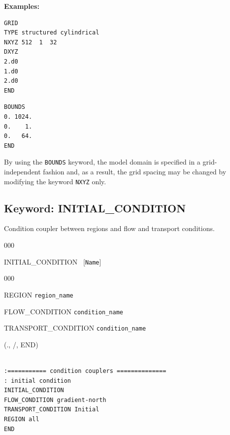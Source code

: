\documentclass[12pt]{article}
\begin{document}
\noindent
{\bf Examples:}
\begin{verbatim}
GRID
TYPE structured cylindrical
NXYZ 512  1  32
DXYZ
2.d0
1.d0
2.d0
END
\end{verbatim}

\begin{verbatim}
BOUNDS
0. 1024.
0.    1.
0.   64.
END
\end{verbatim}

\noindent
By using the {\tt BOUNDS} keyword, the model domain is specified in a grid-independent fashion and, as a result, the grid spacing may be changed by modifying the keyword {\tt NXYZ} only.


\newpage
\protect\hypertarget{target_init}{}

\subsection{Keyword: INITIAL\_CONDITION}

 Condition coupler between regions and flow and transport conditions.

\begin{deflist}{000}
\item[INITIAL\_CONDITION] \ [{\tt Name}]
\begin{deflist}{000}
\item[REGION] {\tt region\_name}
\item[FLOW\_CONDITION] {\tt condition\_name}
\item[TRANSPORT\_CONDITION] {\tt condition\_name}
\end{deflist}
\item[(., /, END)] ~
\end{deflist}



\begin{verbatim}

:=========== condition couplers ==============
: initial condition
INITIAL_CONDITION
FLOW_CONDITION gradient-north
TRANSPORT_CONDITION Initial
REGION all
END
\end{verbatim}
\end{document}
